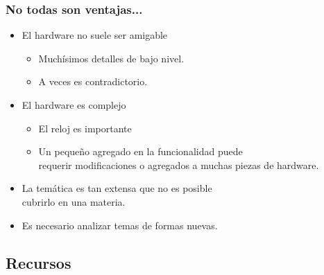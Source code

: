 \documentclass[aspectratio=169,compress]{beamer}
\begin{document}
\begin{frame}[fragile]
  \frametitle{No todas son ventajas...}

\begin{small}
\begin{itemize}

\item El hardware no suele ser amigable

\begin{itemize}
\item Muchísimos detalles de bajo nivel.
\item A veces es contradictorio.
\end{itemize}

\item El hardware es complejo
\begin{itemize}
\item  El reloj es importante
\item Un pequeño agregado en la funcionalidad puede \\
requerir modificaciones o agregados a muchas piezas de hardware.
\end{itemize}
\item La temática es tan extensa que no es posible \\
cubrirlo en una materia.
\item Es necesario analizar temas de formas nuevas.

\end{itemize}
\end{small}

\end{frame}


\subsection{Recursos}
\end{document}

